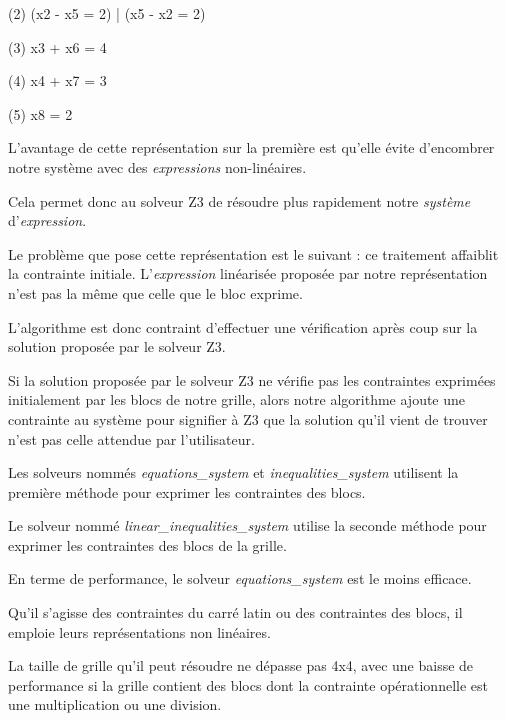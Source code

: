 \documentclass[1]{report}
\begin{document}
\begin{itemize}
        (2) (x2 - x5 = 2) | (x5 - x2 = 2)
        
        (3) x3 + x6 = 4
        
        (4) x4 + x7 = 3
        
        (5) x8 = 2 \newline

        L'avantage de cette représentation sur la première est qu'elle évite d'encombrer notre système avec des \textit{expressions }non-linéaires. 
        
        Cela permet donc au solveur Z3 de résoudre plus rapidement notre \textit{système} d'\textit{expression}. \newline
        
        Le problème que pose cette représentation est le suivant : ce traitement affaiblit la contrainte initiale. L'\textit{expression} linéarisée proposée par notre représentation n'est pas la même que celle que le bloc exprime. 
        
        L'algorithme est donc contraint d'effectuer une vérification après coup sur la solution proposée par
        le solveur Z3. 
        
        Si la solution proposée par le solveur Z3 ne vérifie pas les contraintes exprimées initialement par les blocs de notre grille, alors notre algorithme ajoute une contrainte au système pour signifier à Z3 que la solution qu'il vient de trouver n'est pas celle attendue par l'utilisateur. \newline

        Les solveurs nommés \textit{equations\_system} et \textit{inequalities\_system} utilisent la
        première méthode pour exprimer les contraintes des blocs. 
        
        Le solveur nommé \textit{linear\_inequalities\_system} utilise la seconde méthode pour exprimer les
        contraintes des blocs de la grille. \newline

        En terme de performance, le solveur \textit{equations\_system} est le moins efficace. 
        
        Qu'il s'agisse des contraintes du carré latin ou des contraintes des blocs, il emploie leurs représentations non linéaires. 
        
        La taille de grille qu'il peut résoudre ne dépasse pas 4x4, avec une baisse de performance si la grille contient des blocs dont la contrainte opérationnelle est une multiplication ou une division. \newline
        

\end{itemize}
\end{document}
